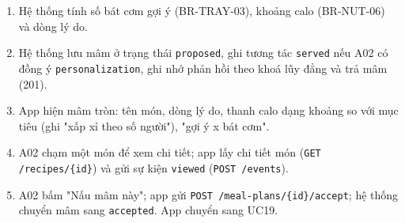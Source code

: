 \begin{enumerate}
\item Hệ thống tính số bát cơm gợi ý (BR-\allowbreak{}TRAY-\allowbreak{}03), khoảng calo (BR-\allowbreak{}NUT-\allowbreak{}06) và dòng lý do.
\item Hệ thống lưu mâm ở trạng thái {\small\texttt{proposed}}, ghi tương tác {\small\texttt{served}} nếu A02 có đồng ý {\small\texttt{personalization}}, ghi nhớ phản hồi theo khoá lũy đẳng và trả mâm (201).
\item App hiện mâm tròn: tên món, dòng lý do, thanh calo dạng khoảng so với mục tiêu (ghi "xấp xỉ theo số người"), "gợi ý x bát cơm".
\item A02 chạm một món để xem chi tiết; app lấy chi tiết món ({\small\texttt{GET /\allowbreak{}\allowbreak{}recipes/\allowbreak{}\allowbreak{}\{id\}}}) và gửi sự kiện {\small\texttt{viewed}} ({\small\texttt{POST /\allowbreak{}\allowbreak{}events}}).
\item A02 bấm "Nấu mâm này"; app gửi {\small\texttt{POST /\allowbreak{}\allowbreak{}meal-\allowbreak{}plans/\allowbreak{}\allowbreak{}\{id\}/\allowbreak{}\allowbreak{}accept}}; hệ thống chuyển mâm sang {\small\texttt{accepted}}. App chuyển sang UC19.
\end{enumerate}
